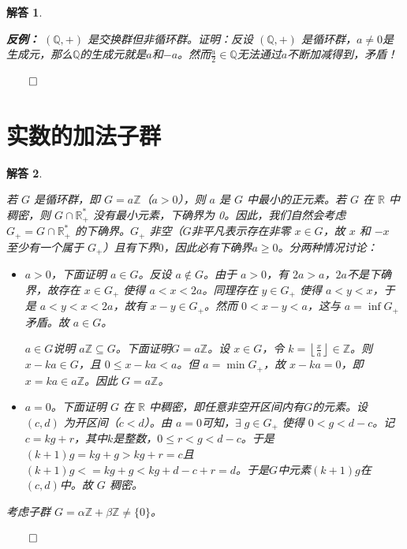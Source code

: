 \documentclass[12pt,UTF8,fontset=none]{ctexbook}
\theoremstyle{exercisestyle}
\theoremstyle{solutionstyle}
\newtheorem*{solution*}{解答}
\newenvironment{solution}
  {\begin{solution*}}
  {\hfill\ensuremath{\qed}\end{solution*}}
\begin{document}
\begin{solution}
\begin{subquestions}
        \textbf{反例：} $(\mathbb{Q},+)$ 是交换群但非循环群。证明：反设 $(\mathbb{Q},+)$ 是循环群，$a\neq 0$是生成元，那么$\mathbb{Q}$的生成元就是$a$和$-a$。然而$\displaystyle\frac{a}{2}\in \mathbb{Q}$无法通过$a$不断加减得到，矛盾！
    \end{subquestions}
\end{solution}

\section{实数的加法子群}
\begin{solution}
  \begin{subquestions}
  \item 若 \(G\) 是循环群，即 \(G = a\mathbb{Z}\)（\(a > 0\)），则 \(a\) 是 \(G\) 中最小的正元素。若 \(G\) 在 \(\mathbb{R}\) 中稠密，则 \(G \cap \mathbb{R}_+^*\) 没有最小元素，下确界为 0。因此，我们自然会考虑 \(G_+ = G \cap \mathbb{R}_+^*\) 的下确界。\(G_+\) 非空（$G$非平凡表示存在非零 \(x \in G\)，故 \(x\) 和 \(-x\) 至少有一个属于 \(G_+\)）且有下界$0$，因此必有下确界$a \geqslant 0$。分两种情况讨论：
  
  \begin{itemize}
    \item \(a > 0\)，下面证明 \(a \in G\)。反设 \(a \notin G\)。由于 \(a > 0\)，有 \(2a > a\)，$2a$不是下确界，故存在 \(x \in G_+\) 使得 \(a < x < 2a\)。同理存在 \(y \in G_+\) 使得 \(a < y < x\)，于是 \(a < y < x < 2a\)，故有 \(x - y \in G_+\)。然而 \(0 < x - y < a\)，这与 \(a = \inf G_+\) 矛盾。故 \(a \in G\)。
    
    \(a \in G\)说明 \(a\mathbb{Z} \subseteq G\)。下面证明\(G = a\mathbb{Z}\)。设 \(x \in G\)，令 \(k = \left\lfloor \frac{x}{a} \right\rfloor \in \mathbb{Z}\)。则 \(x - ka \in G\)，且 \(0 \leqslant x - ka < a\)。但 \(a = \min G_+\)，故 \(x - ka = 0\)，即 \(x = ka \in a\mathbb{Z}\)。因此 \(G = a\mathbb{Z}\)。
    
    \item \(a = 0\)。下面证明 \(G\) 在 \(\mathbb{R}\) 中稠密，即任意非空开区间内有$G$的元素。设 \((c, d)\) 为开区间（\(c < d\)）。由 \(a = 0\)可知，\(\exists \; g \in G_+\) 使得 \(0 < g < d - c\)。记$c = kg + r$，其中$k$是整数，$0\leqslant r < g < d - c$。于是$(k + 1)g = kg + g > kg + r = c$且$(k + 1)g < = kg + g < kg + d - c + r = d$。于是$G$中元素$(k + 1)g$在$(c, d)$中。故 \(G\) 稠密。
  \end{itemize}
    \item 考虑子群 \(G = \alpha \mathbb{Z} + \beta \mathbb{Z} \neq \{0\}\)。
    

\end{subquestions}
\end{solution}
\end{document}
